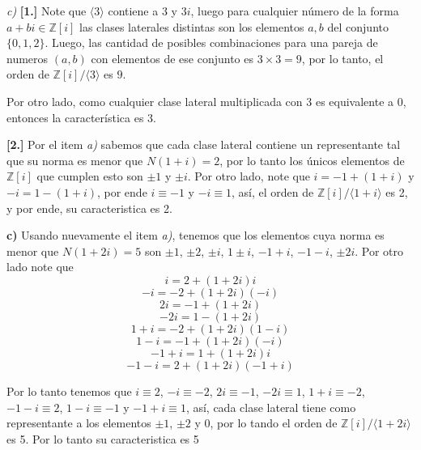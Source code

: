     \textit{c)} \textbf{[1.]} Note que $\langle 3 \rangle$ contiene a $3$ y $3i$, luego para cualquier número de la forma $a +bi \in \mathbb{Z}[i]$ las clases laterales distintas son los elementos $a,b$ del conjunto $\{0, 1, 2\}$. Luego, las cantidad de posibles combinaciones para una pareja de numeros $(a,b)$ con elementos de ese conjunto es $3 \times 3= 9$, por lo tanto, el orden de $\mathbb{Z}[i]/\langle 3 \rangle$ es $9$.

    Por otro lado, como cualquier clase lateral multiplicada con 3 es equivalente a 0, entonces la característica es 3.

    \textbf{[2.]} Por el item \textit{a)} sabemos que cada clase lateral contiene un representante tal que su norma es menor que $N(1 + i) = 2$, por lo tanto los únicos elementos de $\mathbb{Z}[i]$ que cumplen esto son $\pm1$ y $\pm i$. Por otro lado, note que $i = -1 + (1+i)$ y $-i = 1 -(1 + i)$, por ende $i \equiv-1$ y $-i \equiv 1$, así, el orden de $\mathbb{Z}[i]/\langle 1 + i \rangle$ es 2, y por ende, su caracteristica es 2.

    \textbf{c)} Usando nuevamente el item \textit{a)}, tenemos que los elementos cuya norma es menor que $N(1 +2i) = 5$ son $\pm 1$, $\pm2$, $\pm i$, $1\pm i$, $-1+i$, $-1-i$, $\pm2i$. Por otro lado note que
    $$i = 2+ (1+2i)i$$
    $$-i = -2+(1+2i)(-i)$$
    $$2i = -1 +(1+2i)$$
    $$-2i = 1 - (1+2i)$$
    $$1 + i = -2 + (1+2i)(1-i)$$
    $$1-i = -1 +(1+2i)(-i)$$
    $$-1+i = 1 + (1+2i)i$$
    $$-1-i = 2 + (1+2i)(-1+i)$$

    Por lo tanto tenemos que $i \equiv2$, $-i \equiv-2$, $2i \equiv -1$, $-2i \equiv 1$, $1+i \equiv -2$, $-1-i \equiv 2$, $1-i \equiv -1$ y $-1+i\equiv 1$, así, cada clase lateral tiene como representante a los elementos $\pm 1$, $\pm 2$ y $0$, por lo tando el orden de $\mathbb{Z}[i]/\langle 1 + 2i \rangle$ es 5. Por lo tanto su caracteristica es 5 
